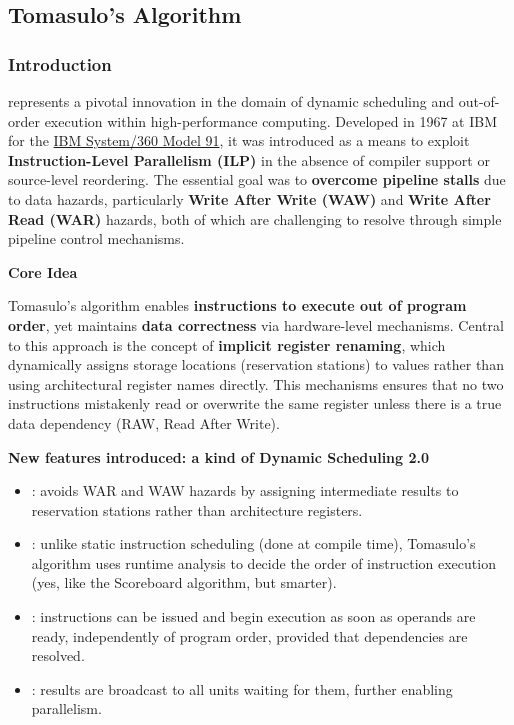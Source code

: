 \subsection{Tomasulo's Algorithm}\label{subsection: tomasulo algorithm}

\subsubsection{Introduction}

 represents a pivotal innovation in the domain of dynamic scheduling and out-of-order execution within high-performance computing. Developed in 1967 at IBM for the \href{https://en.wikipedia.org/wiki/IBM_System/360_Model_91}{IBM System/360 Model 91}, it was introduced as a means to exploit \textbf{Instruction-Level Parallelism (ILP)} in the absence of compiler support or source-level reordering. The essential goal was to \textbf{overcome pipeline stalls} due to data hazards, particularly \textbf{Write After Write (WAW)} and \textbf{Write After Read (WAR)} hazards, both of which are challenging to resolve through simple pipeline control mechanisms.

\highspace
\begin{flushleft}
    \textcolor{Green3}{ \textbf{Core Idea}}
\end{flushleft}
Tomasulo's algorithm enables \textbf{instructions to execute out of program order}, yet maintains \textbf{data correctness} via hardware-level mechanisms. Central to this approach is the concept of \textbf{implicit register renaming}, which dynamically assigns storage locations (reservation stations) to values rather than using architectural register names directly. This mechanisms ensures that no two instructions mistakenly read or overwrite the same register unless there is a true data dependency (RAW, Read After Write).

\highspace
\begin{flushleft}
    \textcolor{Green3}{ \textbf{New features introduced: a kind of Dynamic Scheduling 2.0}}
\end{flushleft}
\begin{itemize}
    \item {}: avoids WAR and WAW hazards by assigning intermediate results to reservation stations rather than architecture registers.
    \item {}: unlike static instruction scheduling (done at compile time), Tomasulo's algorithm uses runtime analysis to decide the order of instruction execution (yes, like the Scoreboard algorithm, but smarter).
    \item {}: instructions can be issued and begin execution as soon as operands are ready, independently of program order, provided that dependencies are resolved.
    \item {}: results are broadcast to all units waiting for them, further enabling parallelism.
\end{itemize}


